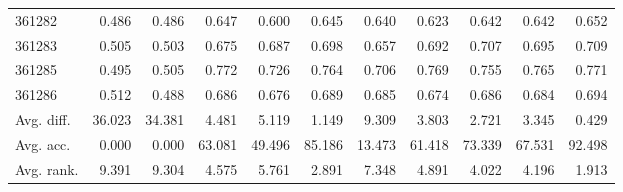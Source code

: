 \begin{tabular}{lrrrrrrrrrr}
361282 & 0.486 & 0.486 & 0.647 & 0.600 & 0.645 & 0.640 & 0.623 & 0.642 & 0.642 & 0.652 \\
361283 & 0.505 & 0.503 & 0.675 & 0.687 & 0.698 & 0.657 & 0.692 & 0.707 & 0.695 & 0.709 \\
361285 & 0.495 & 0.505 & 0.772 & 0.726 & 0.764 & 0.706 & 0.769 & 0.755 & 0.765 & 0.771 \\
361286 & 0.512 & 0.488 & 0.686 & 0.676 & 0.689 & 0.685 & 0.674 & 0.686 & 0.684 & 0.694 \\
Avg. diff. & 36.023 & 34.381 & 4.481 & 5.119 & 1.149 & 9.309 & 3.803 & 2.721 & 3.345 & 0.429 \\
Avg. acc. & 0.000 & 0.000 & 63.081 & 49.496 & 85.186 & 13.473 & 61.418 & 73.339 & 67.531 & 92.498 \\
Avg. rank. & 9.391 & 9.304 & 4.575 & 5.761 & 2.891 & 7.348 & 4.891 & 4.022 & 4.196 & 1.913 \\
\bottomrule
\end{tabular}
